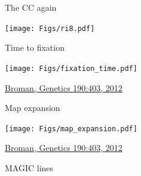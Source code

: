 \documentclass[12pt]{article}
\newcommand{\citesize}{\fontsize{14}{18} \selectfont}
\newcommand{\headsize}{\fontsize{35}{35} \selectfont}
\begin{document}
{\vspace*{5mm}

\newpage


\headsize \color{myyellow}
\hfill \begin{minipage}{5.75in}
\centering
The CC again
\end{minipage}

\vfill

\centerline{\texttt{[image: Figs/ri8.pdf]}}


\newpage


\headsize \color{myyellow}
\hfill \begin{minipage}{5.75in}
\centering
Time to fixation
\end{minipage}

\vspace{15mm}

\centerline{\texttt{[image: Figs/fixation\_time.pdf]}}


\vfill

\hfill {\citesize \color{citecolor} \href{http://www.genetics.org/content/190/2/403.full}{Broman, Genetics
190:403, 2012}}

\vspace*{5mm}



\newpage


\headsize \color{myyellow}
\hfill \begin{minipage}{5.75in}
\centering
Map expansion
\end{minipage}

\vspace{12mm}

\centerline{\texttt{[image: Figs/map\_expansion.pdf]}}

\vfill

\hfill {\citesize \color{citecolor} \href{http://www.genetics.org/content/190/2/403.full}{Broman, Genetics
190:403, 2012}}

\vspace*{5mm}



\newpage


\headsize \color{myyellow}
\hfill \begin{minipage}{5.75in}
\centering
MAGIC lines
\end{minipage}

}
\end{document}
